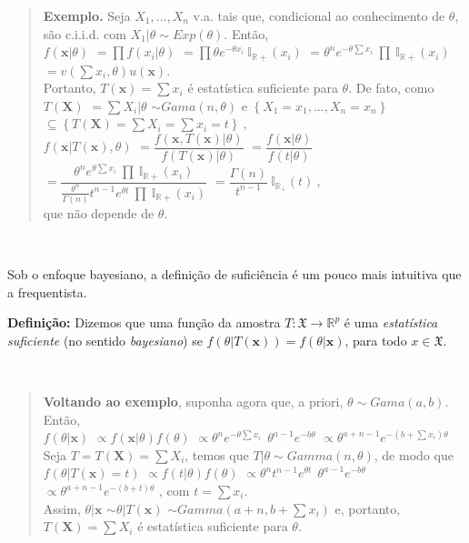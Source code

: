\documentclass[
]{book}
\begin{document}
\begin{quote}
\textbf{Exemplo.} Seja \(X_1,\ldots,X_n\) v.a. tais que, condicional ao conhecimento de \(\theta\), são c.i.i.d. com \(X_1|\theta \sim Exp(\theta)\). Então,\\
\(f(\boldsymbol x|\theta)\) \(=\prod f(x_i|\theta)\) \(=\prod \theta e^{-\theta x_i} ~\mathbb{I}_{\mathbb{R+}}(x_i)\) \(=\theta^n e^{-\theta \sum x_i} ~\prod ~\mathbb{I}_{\mathbb{R+}}(x_i)\) \(= v\left(\sum x_i, \theta\right) u(\boldsymbol x)\).\\
Portanto, \(T(\boldsymbol x) = \sum x_i\) é estatística suficiente para \(\theta\). De fato, como \(T(\boldsymbol X)\) \(= \sum X_i | \theta\) \(\sim Gama(n,\theta)\) e \(\left\{X_1=x_1,\ldots,X_n=x_n\right\}\) \(\subseteq \left\{T(\boldsymbol X) = \sum X_i = \sum x_i = t\right\}~,\)\\
\(f\left(\boldsymbol x| T(\boldsymbol x),\theta\right)\) \(=\dfrac{f\left(\boldsymbol{x},T(\boldsymbol{x})|\theta\right)}{f\left(T(\boldsymbol{x})|\theta\right)}\) \(=\dfrac{f\left(\boldsymbol{x}|\theta\right)}{f\left(t|\theta\right)}\) \(=\dfrac{\theta^n e^{\theta \sum x_i} ~\prod ~\mathbb{I}_{\mathbb{R+}}(x_i)}{\frac{\theta^n}{\Gamma(n)}t^{n-1} e^{\theta t} ~\prod ~\mathbb{I}_{\mathbb{R+}}(x_i)}\) \(= \dfrac{\Gamma(n)}{t^{n-1}} ~\mathbb{I}_{\mathbb{R}_+}\left(t\right)~,\)\\
que não depende de \(\theta\).
\end{quote}

\(~\)

Sob o enfoque bayesiano, a definição de suficiência é um pouco mais intuitiva que a frequentista.

\textbf{Definição:} Dizemos que uma função da amostra \(T:\mathfrak{X} \rightarrow \mathbb{R}^p\) é uma \emph{estatística suficiente} (no sentido \emph{bayesiano}) se \(f\left(\theta | T(\boldsymbol x)\right) = f\left(\theta | \boldsymbol x\right)\), para todo \(x \in \mathfrak{X}\).

\(~\)

\begin{quote}
\textbf{Voltando ao exemplo}, suponha agora que, a priori, \(\theta \sim Gama(a,b)\). Então,\\
\(f(\theta| \boldsymbol x)\) \(\propto f(\boldsymbol x|\theta)f(\theta)\) \(\propto \theta^n e^{-\theta \sum x_i} ~~\theta^{a-1}e^{-b\theta}\) \(\propto \theta^{a+n-1} e^{-(b+\sum x_i)\theta}\)\\
Seja \(T = T(\boldsymbol X) = \sum X_i\), temos que \(T|\theta\sim Gamma(n,\theta)\), de modo que\\
\(f\left(\theta| T(\boldsymbol x)=t\right)\) \(\propto f(t|\theta)f(\theta)\) \(\propto \theta^n t^{n-1} e^{\theta t} ~~\theta^{a-1}e^{-b\theta}\) \(\propto \theta^{a+n-1} e^{-(b+t)\theta}\) , com \(t=\sum x_i\).\\
Assim, \(\theta|\boldsymbol x\) \(\sim \theta|T(\boldsymbol x)\) \(\sim Gamma\left(a+n,b+\sum x_i\right)\) e, portanto, \(T(\boldsymbol X) = \sum X_i\) é estatística suficiente para \(\theta\).
\end{quote}
\end{document}
